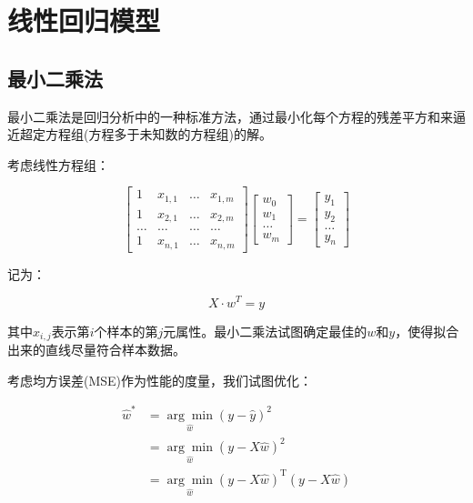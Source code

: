 \documentclass{article}
\begin{document}
\section{线性回归模型}

\subsection{最小二乘法}

最小二乘法是回归分析中的一种标准方法，通过最小化每个方程的残差平方和来逼近超定方程组(方程多于未知数的方程组)的解。

考虑线性方程组：

\begin{equation}
	\left[\begin{array}{cccc}{1} & {x_{1,1}} & {\ldots} & {x_{1,m}} \\ {1} & {x_{2,1}} & {\ldots} & {x_{2,m}} \\ {\ldots} & {\ldots} & {\ldots} & {\ldots} \\ {1} & {x_{n,1}} & {\ldots} & {x_{n,m}}\end{array}\right]\left[\begin{array}{c}{w_{0}} \\ {w_{1}} \\ {\ldots} \\ {w_{m}}\end{array}\right]=\left[\begin{array}{c}{y_1} \\ {y_2} \\ {\ldots} \\ {y_{n}}\end{array}\right]
\end{equation}

记为：

\begin{equation}\label{euqa:1}
	X\cdot w^T=y
\end{equation}

其中$x_{i,j}$表示第$i$个样本的第$j$元属性。最小二乘法试图确定最佳的$w$和$y$，使得拟合出来的直线尽量符合样本数据。

考虑均方误差(MSE)作为性能的度量，我们试图优化：

\begin{equation}
\begin{aligned}
\hat{w}^{*}&=\underset{\hat{w}}{\arg \min }(y-\hat{y})^2 \\ 
&=\underset{\hat{w}}{\arg \min }(y-X\hat{w})^2 \\
&= \underset{\hat{w}}{\arg \min }(y-{X} \hat{{w}})^{\mathrm{T}}({y}-{X} \hat{{w}})
\end{aligned}
\end{equation}
\end{document}
